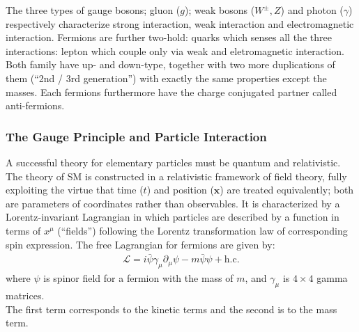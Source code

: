 The three types of gauge bosons; gluon ($g$); weak bosons ($W^{\pm},Z$) and photon ($\gamma$) respectively characterize strong interaction, weak interaction and electromagnetic interaction. 
Fermions are further two-hold: quarks which senses all the three interactions: lepton which couple only via weak and eletromagnetic interaction. Both family have up- and down-type, together with two more duplications of them (``2nd / 3rd generation'') with exactly the same properties except the masses. Each fermions furthermore have the charge conjugated partner called anti-fermions. \\


\subsubsection{The Gauge Principle and Particle Interaction} \label{sec::Introduction::gaugePrinciple}
A successful theory for elementary particles must be quantum and relativistic.
The theory of SM is constructed in a relativistic framework of field theory, fully exploiting the virtue that time ($t$) and position ($\bm{x}$) are treated equivalently; both are parameters of coordinates rather than observables. It is characterized by a Lorentz-invariant Lagrangian in which particles are described by a function in terms of $x^\mu$ (``fields'') following the Lorentz transformation law of corresponding spin expression. The free Lagrangian for fermions are given by:
\begin{align}
\mathcal{L} = i \bar{\psi} \gamma_\mu \partial_\mu \psi - m \bar{\psi}\psi + \mathrm{h.c.}
\label{eq::SMfreeLag}
\end{align}
where $\psi$ is spinor field for a fermion with the mass of $m$, and $\gamma_\mu$ is $4\times4$ gamma matrices. \\
The first term corresponds to the kinetic terms and the second is to the mass term.

